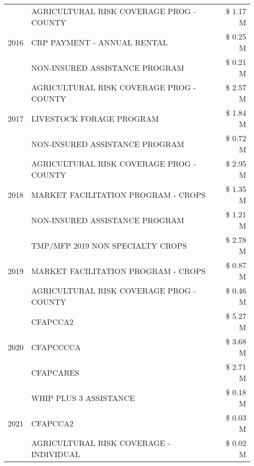 \begin{tabular}{llr}
\cline{1-3}
\multirow[t]{3}{*}{2016} & AGRICULTURAL RISK COVERAGE PROG - COUNTY & \$ 1.17 M \\
 & CRP PAYMENT - ANNUAL RENTAL & \$ 0.25 M \\
 & NON-INSURED ASSISTANCE PROGRAM & \$ 0.21 M \\
\cline{1-3}
\multirow[t]{3}{*}{2017} & AGRICULTURAL RISK COVERAGE PROG - COUNTY & \$ 2.57 M \\
 & LIVESTOCK FORAGE PROGRAM & \$ 1.84 M \\
 & NON-INSURED ASSISTANCE PROGRAM & \$ 0.72 M \\
\cline{1-3}
\multirow[t]{3}{*}{2018} & AGRICULTURAL RISK COVERAGE PROG - COUNTY & \$ 2.95 M \\
 & MARKET FACILITATION PROGRAM - CROPS & \$ 1.35 M \\
 & NON-INSURED ASSISTANCE PROGRAM & \$ 1.21 M \\
\cline{1-3}
\multirow[t]{3}{*}{2019} & TMP/MFP 2019 NON SPECIALTY CROPS & \$ 2.78 M \\
 & MARKET FACILITATION PROGRAM - CROPS & \$ 0.87 M \\
 & AGRICULTURAL RISK COVERAGE PROG - COUNTY & \$ 0.46 M \\
\cline{1-3}
\multirow[t]{3}{*}{2020} & CFAPCCA2 & \$ 5.27 M \\
 & CFAPCCCCA & \$ 3.68 M \\
 & CFAPCARES & \$ 2.71 M \\
\cline{1-3}
\multirow[t]{3}{*}{2021} & WHIP PLUS 3 ASSISTANCE & \$ 0.18 M \\
 & CFAPCCA2 & \$ 0.03 M \\
 & AGRICULTURAL RISK COVERAGE - INDIVIDUAL & \$ 0.02 M \\
\cline{1-3}
\bottomrule
\end{tabular}
